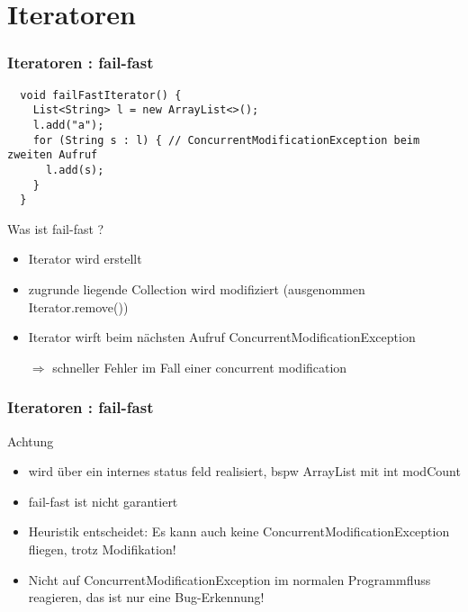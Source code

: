 \section{Iteratoren}

\begin{frame}[fragile]
  \frametitle{Iteratoren : fail-fast}

  \begin{lstlisting}
  void failFastIterator() {
    List<String> l = new ArrayList<>();
    l.add("a");
    for (String s : l) { // ConcurrentModificationException beim zweiten Aufruf
      l.add(s);
    }
  }
  \end{lstlisting}

  \begin{block}{Was ist fail-fast ?}
    \begin{itemize}[<+->]
      \item Iterator wird erstellt
      \item zugrunde liegende Collection wird modifiziert (ausgenommen Iterator.remove())
      \item Iterator wirft beim nächsten Aufruf ConcurrentModificationException
      \item[$\Rightarrow$] schneller Fehler im Fall einer concurrent modification
    \end{itemize}
  \end{block}

\end{frame}

\begin{frame}
  \frametitle{Iteratoren : fail-fast}

  \begin{block}{Achtung}
    \begin{itemize}[<+->]
      \item wird über ein internes status feld realisiert, bspw ArrayList mit int modCount
      \item fail-fast ist nicht garantiert
      \item Heuristik entscheidet: Es kann auch keine ConcurrentModificationException fliegen, trotz Modifikation!
      \item Nicht auf ConcurrentModificationException im normalen Programmfluss reagieren, das ist nur eine Bug-Erkennung!
    \end{itemize}
  \end{block}

\end{frame}

